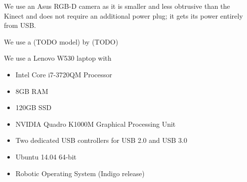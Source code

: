 We use an Asus RGB-D camera as it is smaller and less obtrusive than the Kinect
and does not require an additional power plug; it gets its power entirely from
USB.


We use a (TODO model) by (TODO) 

We use a Lenovo W530 laptop with 
\begin{itemize}
\item Intel Core i7-3720QM Processor
\item 8GB RAM
\item 120GB SSD
\item NVIDIA Quadro K1000M Graphical Processing Unit
\item Two dedicated USB controllers for USB 2.0 and USB 3.0
\item Ubuntu 14.04 64-bit
\item Robotic Operating System (Indigo release)
\end{itemize}


\endinput
Any text after an \endinput is ignored.

\section{Summary of Thesis}
\subsection{One sentence summary}
We introduce an autonomous back-in parking system for powered wheelchairs
equipped with an RGB-D sensor, that finds a suitable place to park in a room
without any marked parking spots.

\subsection{One paragraph summary}
We address the problem: Where

\subsection{Five minute read summary}

\paragraph{What is this?} A collection of research ideas.

\paragraph{Who's it for?} Me.

TODO use this \cite{viswanathan2011navigation}

